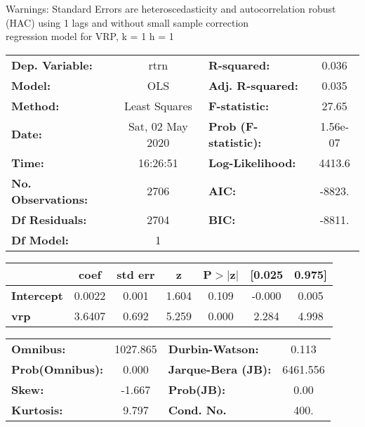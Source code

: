 Warnings: \newline
 [1] Standard Errors are heteroscedasticity and autocorrelation robust (HAC) using 1 lags and without small sample correction\\ 

regression model for VRP, k = 1 h = 1\begin{center}
\begin{tabular}{lclc}
\toprule
\textbf{Dep. Variable:}    &       rtrn       & \textbf{  R-squared:         } &     0.036   \\
\textbf{Model:}            &       OLS        & \textbf{  Adj. R-squared:    } &     0.035   \\
\textbf{Method:}           &  Least Squares   & \textbf{  F-statistic:       } &     27.65   \\
\textbf{Date:}             & Sat, 02 May 2020 & \textbf{  Prob (F-statistic):} &  1.56e-07   \\
\textbf{Time:}             &     16:26:51     & \textbf{  Log-Likelihood:    } &    4413.6   \\
\textbf{No. Observations:} &        2706      & \textbf{  AIC:               } &    -8823.   \\
\textbf{Df Residuals:}     &        2704      & \textbf{  BIC:               } &    -8811.   \\
\textbf{Df Model:}         &           1      & \textbf{                     } &             \\
\bottomrule
\end{tabular}
\begin{tabular}{lcccccc}
                   & \textbf{coef} & \textbf{std err} & \textbf{z} & \textbf{P$> |$z$|$} & \textbf{[0.025} & \textbf{0.975]}  \\
\midrule
\textbf{Intercept} &       0.0022  &        0.001     &     1.604  &         0.109        &       -0.000    &        0.005     \\
\textbf{vrp}       &       3.6407  &        0.692     &     5.259  &         0.000        &        2.284    &        4.998     \\
\bottomrule
\end{tabular}
\begin{tabular}{lclc}
\textbf{Omnibus:}       & 1027.865 & \textbf{  Durbin-Watson:     } &    0.113  \\
\textbf{Prob(Omnibus):} &   0.000  & \textbf{  Jarque-Bera (JB):  } & 6461.556  \\
\textbf{Skew:}          &  -1.667  & \textbf{  Prob(JB):          } &     0.00  \\
\textbf{Kurtosis:}      &   9.797  & \textbf{  Cond. No.          } &     400.  \\
\bottomrule
\end{tabular}
\end{center}

